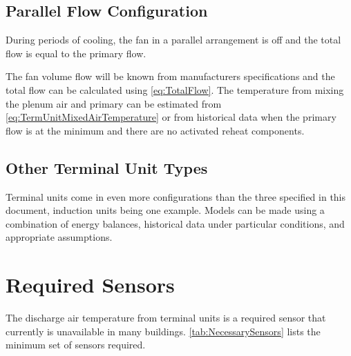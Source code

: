\subsection{Parallel Flow Configuration}

During periods of cooling, the fan in a parallel arrangement is off and the
total flow is equal to the primary flow.

The fan volume flow will be known from manufacturers specifications and
the total flow can be calculated using  \ref{eq:TotalFlow}.
The temperature from mixing the plenum air and primary can be estimated
from  \ref{eq:TermUnitMixedAirTemperature} or from
historical data when the primary flow is at the minimum and there are no
activated reheat components.

\subsection{Other Terminal Unit Types}

Terminal units come in even more configurations than the three specified
in this document, induction units being one example. Models can be made
using a combination of energy balances, historical data under particular
conditions, and appropriate assumptions.

\section{Required Sensors}

The discharge air temperature from terminal units is a required sensor
that currently is unavailable in many buildings.  \tableref{}
\ref{tab:NecessarySensors} lists the minimum set of sensors required.



